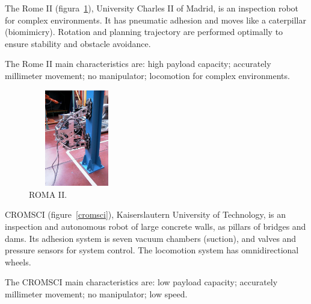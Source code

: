 The Rome II (figura~\ref{roma2}), University Charles II of Madrid, is an
inspection robot for complex environments. It has pneumatic adhesion and moves
like a caterpillar (biomimicry). Rotation and planning trajectory are performed
optimally to ensure stability and obstacle avoidance.

The Rome II main characteristics are: high payload capacity; accurately
millimeter movement; no manipulator; locomotion for complex environments.

\begin{figure}[ht]
\centering
\includegraphics[width=4.2cm,height=4.2cm]{figs/climbers/roma2.jpg}
\caption{ROMA II.}
\label{roma2}
\end{figure}


CROMSCI (figure~\ref{cromsci}), Kaiserslautern University of Technology, is an
inspection and autonomous robot of large concrete walls, as
pillars of bridges and dams. Its adhesion system is seven vacuum
chambers (suction), and valves and pressure sensors for system control. The
locomotion system has omnidirectional wheels.

The CROMSCI main characteristics are: low payload capacity; accurately
millimeter movement; no manipulator; low speed.

